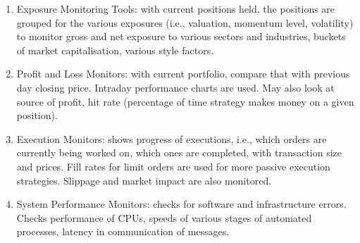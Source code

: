 \begin{method} 
\begin{enumerate}[label=\roman*.]
\setlength{\itemsep}{0pt}
\item Exposure Monitoring Tools: with current positions held, the positions are grouped for the various exposures (i.e., valuation, momentum level, volatility) to monitor gross and net exposure to various sectors and industries, buckets of market capitalisation, various style factors.
\item Profit and Loss Monitors: with current portfolio, compare that with previous day closing price. Intraday performance charts are used. May also look at source of profit, hit rate (percentage of time strategy makes money on a given position).
\item Execution Monitors: shows progress of executions, i.e., which orders are currently being worked on, which ones are completed, with transaction size and prices. Fill rates for limit orders are used for more passive execution strategies. Slippage and market impact are also monitored.
\item System Performance Monitors: checks for software and infrastructure errors. Checks performance of CPUs, speeds of various stages of automated processes, latency in communication of messages.
\end{enumerate}
\end{method}